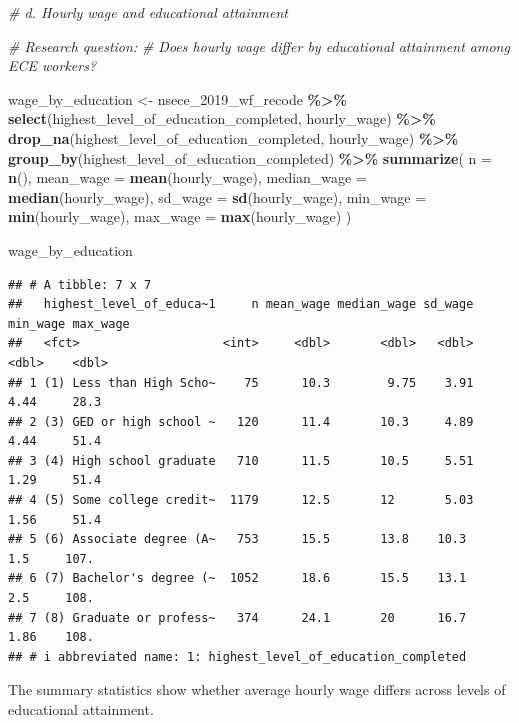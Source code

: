 \documentclass[
]{article}
\newenvironment{Shaded}{\begin{snugshade}}{\end{snugshade}}
\newcommand{\AttributeTok}[1]{\textcolor[rgb]{0.13,0.29,0.53}{#1}}
\newcommand{\CommentTok}[1]{\textcolor[rgb]{0.56,0.35,0.01}{\textit{#1}}}
\newcommand{\FunctionTok}[1]{\textcolor[rgb]{0.13,0.29,0.53}{\textbf{#1}}}
\newcommand{\NormalTok}[1]{#1}
\newcommand{\OtherTok}[1]{\textcolor[rgb]{0.56,0.35,0.01}{#1}}
\newcommand{\SpecialCharTok}[1]{\textcolor[rgb]{0.81,0.36,0.00}{\textbf{#1}}}
\begin{document}
\begin{Shaded}
\begin{Highlighting}[]
\CommentTok{\# d. Hourly wage and educational attainment}

\CommentTok{\# Research question:}
\CommentTok{\# Does hourly wage differ by educational attainment among ECE workers?}

\NormalTok{wage\_by\_education }\OtherTok{\textless{}{-}}
\NormalTok{  nsece\_2019\_wf\_recode }\SpecialCharTok{\%\textgreater{}\%}
  \FunctionTok{select}\NormalTok{(highest\_level\_of\_education\_completed, hourly\_wage) }\SpecialCharTok{\%\textgreater{}\%}
  \FunctionTok{drop\_na}\NormalTok{(highest\_level\_of\_education\_completed, hourly\_wage) }\SpecialCharTok{\%\textgreater{}\%}
  \FunctionTok{group\_by}\NormalTok{(highest\_level\_of\_education\_completed) }\SpecialCharTok{\%\textgreater{}\%}
  \FunctionTok{summarize}\NormalTok{(}
    \AttributeTok{n =} \FunctionTok{n}\NormalTok{(),}
    \AttributeTok{mean\_wage =} \FunctionTok{mean}\NormalTok{(hourly\_wage),}
    \AttributeTok{median\_wage =} \FunctionTok{median}\NormalTok{(hourly\_wage),}
    \AttributeTok{sd\_wage =} \FunctionTok{sd}\NormalTok{(hourly\_wage),}
    \AttributeTok{min\_wage =} \FunctionTok{min}\NormalTok{(hourly\_wage),}
    \AttributeTok{max\_wage =} \FunctionTok{max}\NormalTok{(hourly\_wage)}
\NormalTok{  )}

\NormalTok{wage\_by\_education}
\end{Highlighting}
\end{Shaded}

\begin{verbatim}
## # A tibble: 7 x 7
##   highest_level_of_educa~1     n mean_wage median_wage sd_wage min_wage max_wage
##   <fct>                    <int>     <dbl>       <dbl>   <dbl>    <dbl>    <dbl>
## 1 (1) Less than High Scho~    75      10.3        9.75    3.91     4.44     28.3
## 2 (3) GED or high school ~   120      11.4       10.3     4.89     4.44     51.4
## 3 (4) High school graduate   710      11.5       10.5     5.51     1.29     51.4
## 4 (5) Some college credit~  1179      12.5       12       5.03     1.56     51.4
## 5 (6) Associate degree (A~   753      15.5       13.8    10.3      1.5     107. 
## 6 (7) Bachelor's degree (~  1052      18.6       15.5    13.1      2.5     108. 
## 7 (8) Graduate or profess~   374      24.1       20      16.7      1.86    108. 
## # i abbreviated name: 1: highest_level_of_education_completed
\end{verbatim}

The summary statistics show whether average hourly wage differs across
levels of educational attainment.
\end{document}
